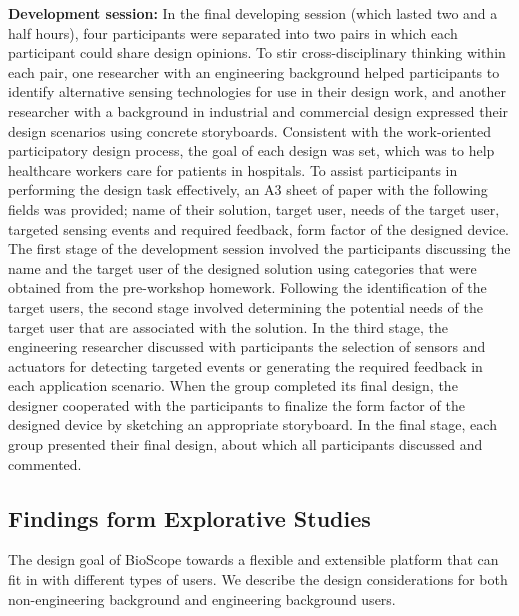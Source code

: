 \textbf{Development session:} 
\newline
In the final developing session (which lasted two and a half hours), four participants were separated into two pairs in which each participant could share design opinions. To stir cross-disciplinary thinking within each pair, one researcher with an engineering background helped participants to identify alternative sensing technologies for use in their design work, and another researcher with a background in industrial and commercial design expressed their design scenarios using concrete storyboards. Consistent with the work-oriented participatory design process, the goal of each design was set, which was to help healthcare workers care for patients in hospitals. To assist participants in performing the design task effectively, an A3 sheet of paper with the following fields was provided; name of their solution, target user, needs of the target user, targeted sensing events and required feedback, form factor of the designed device. The first stage of the development session involved the participants discussing the name and the target user of the designed solution using categories that were obtained from the pre-workshop homework. Following the identification of the target users, the second stage involved determining the potential needs of the target user that are associated with the solution. In the third stage, the engineering researcher discussed with participants the selection of sensors and actuators for detecting targeted events or generating the required feedback in each application scenario. When the group completed its final design, the designer cooperated with the participants to finalize the form factor of the designed device by sketching an appropriate storyboard. In the final stage, each group presented their final design, about which all participants discussed and commented.

\subsection{Findings form Explorative Studies}
The design goal of BioScope towards a flexible and extensible platform that can fit in with different types of users. We describe the design considerations for both non-engineering background and engineering background users.

